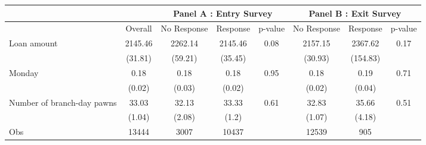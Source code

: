 \begin{tabular}{lcccc|ccc}
\toprule
      &       & \multicolumn{3}{c|}{Panel A : Entry Survey} & \multicolumn{3}{c}{Panel B : Exit Survey} \\
\midrule
\midrule
      & Overall & No Response & Response & p-value & No Response & Response & p-value \\
\midrule
\midrule
Loan amount  & 2145.46 & 2262.14 & 2145.46 & 0.08  & 2157.15 & 2367.62 & 0.17 \\
      & (31.81) & (59.21) & (35.45) &       & (30.93) & (154.83) &  \\
Monday & 0.18  & 0.18  & 0.18  & 0.95  & 0.18  & 0.19  & 0.71 \\
      & (0.02) & (0.03) & (0.02) &       & (0.02) & (0.04) &  \\
Number of branch-day pawns & 33.03 & 32.13 & 33.33 & 0.61  & 32.83 & 35.66 & 0.51 \\
      & (1.04) & (2.08) & (1.2) &       & (1.07) & (4.18) &  \\
\midrule
Obs   & 13444 & 3007  & 10437 &       & 12539 & 905   &  \\
\bottomrule
\bottomrule
\end{tabular}%
